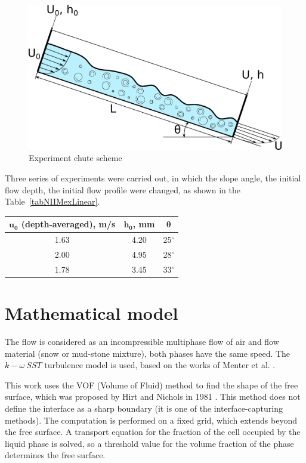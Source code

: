 \documentclass[sensors,article,submit,moreauthors,pdftex]{Definitions/mdpi}
\begin{document}
\begin{figure}[H]	
\widefigure
\includegraphics[width=10 cm]{NIIMexLinearUProfileInlet.png}
\caption{Experiment chute scheme\label{NIIMexLinearUProfileInlet}}
\end{figure}

Three series of experiments were carried out, in which the slope angle, the initial flow depth, the initial flow profile were changed, as shown in the Table~\ref{tabNIIMexLinear}.

\begin{specialtable}[H] 
\caption{Experiments parameters\label{tabNIIMexLinear}}
\begin{tabular}{ | c | c | c | }
\toprule
\textbf{$\boldsymbol{u_0}$ (depth-averaged), m/s}	& \textbf{$\boldsymbol{h_0}$, mm}	& \textbf{$\boldsymbol{\theta}$}\\
\midrule
1.63 & 4.20 & 25$^\circ$\\
2.00 & 4.95 & 28$^\circ$\\
1.78 & 3.45 & 33$^\circ$\\
\bottomrule
\end{tabular}
\end{specialtable}


\section{Mathematical model}

The flow is considered as an incompressible multiphase flow of air and flow material (snow or mud-stone mixture), both phases have the same speed. The $k-\omega\ SST$ turbulence model is used, based on the works of Menter et al. \cite{Menter1993, Menter1994, MenterKuntzLangtry2003}.

This work uses the VOF (Volume of Fluid) method to find the shape of the free surface, which was proposed by Hirt and Nichols in 1981 \cite{HirtNichols1981}. This method does not define the interface as a sharp boundary (it is one of the interface-capturing methods). The computation is performed on a fixed grid, which extends beyond the free surface. A transport equation for the fraction of the cell occupied by the liquid phase is solved, so a threshold value for the volume fraction of the phase determines the free surface.
\end{document}
